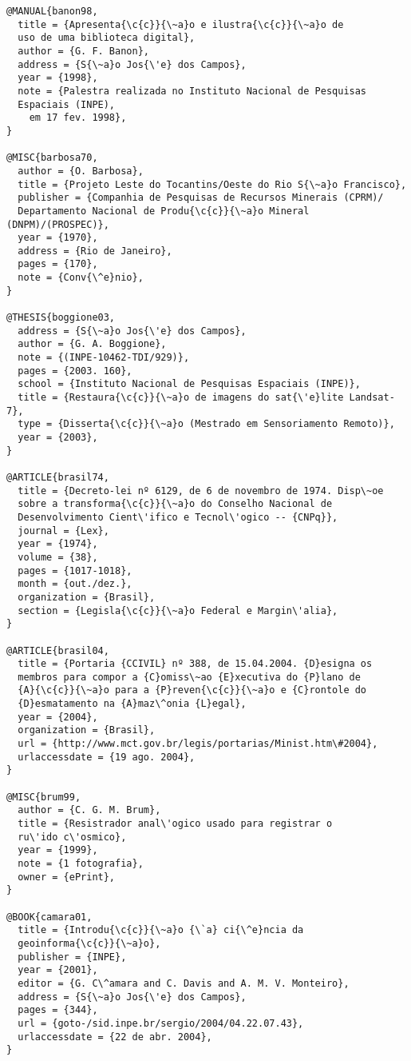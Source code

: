 \begin{verbatim}
@MANUAL{banon98,
  title = {Apresenta{\c{c}}{\~a}o e ilustra{\c{c}}{\~a}o de 
  uso de uma biblioteca digital},
  author = {G. F. Banon},
  address = {S{\~a}o Jos{\'e} dos Campos},
  year = {1998},
  note = {Palestra realizada no Instituto Nacional de Pesquisas 
  Espaciais (INPE),
	em 17 fev. 1998},
}

@MISC{barbosa70, 
  author = {O. Barbosa},
  title = {Projeto Leste do Tocantins/Oeste do Rio S{\~a}o Francisco},  
  publisher = {Companhia de Pesquisas de Recursos Minerais (CPRM)/
  Departamento Nacional de Produ{\c{c}}{\~a}o Mineral (DNPM)/(PROSPEC)},
  year = {1970},
  address = {Rio de Janeiro}, 
  pages = {170},
  note = {Conv{\^e}nio},
}

@THESIS{boggione03,
  address = {S{\~a}o Jos{\'e} dos Campos},
  author = {G. A. Boggione}, 
  note = {(INPE-10462-TDI/929)},
  pages = {2003. 160},
  school = {Instituto Nacional de Pesquisas Espaciais (INPE)},
  title = {Restaura{\c{c}}{\~a}o de imagens do sat{\'e}lite Landsat-7},
  type = {Disserta{\c{c}}{\~a}o (Mestrado em Sensoriamento Remoto)},
  year = {2003},
}

@ARTICLE{brasil74,
  title = {Decreto-lei nº 6129, de 6 de novembro de 1974. Disp\~oe 
  sobre a transforma{\c{c}}{\~a}o do Conselho Nacional de 
  Desenvolvimento Cient\'ifico e Tecnol\'ogico -- {CNPq}},
  journal = {Lex},
  year = {1974},
  volume = {38},
  pages = {1017-1018},
  month = {out./dez.},
  organization = {Brasil},
  section = {Legisla{\c{c}}{\~a}o Federal e Margin\'alia},
}

@ARTICLE{brasil04,
  title = {Portaria {CCIVIL} nº 388, de 15.04.2004. {D}esigna os 
  membros para compor a {C}omiss\~ao {E}xecutiva do {P}lano de 
  {A}{\c{c}}{\~a}o para a {P}reven{\c{c}}{\~a}o e {C}rontole do 
  {D}esmatamento na {A}maz\^onia {L}egal},
  year = {2004},
  organization = {Brasil},
  url = {http://www.mct.gov.br/legis/portarias/Minist.htm\#2004},
  urlaccessdate = {19 ago. 2004},
}

@MISC{brum99,
  author = {C. G. M. Brum},
  title = {Resistrador anal\'ogico usado para registrar o 
  ru\'ido c\'osmico},
  year = {1999},
  note = {1 fotografia},
  owner = {ePrint},
}

@BOOK{camara01,
  title = {Introdu{\c{c}}{\~a}o {\`a} ci{\^e}ncia da 
  geoinforma{\c{c}}{\~a}o},
  publisher = {INPE},
  year = {2001},
  editor = {G. C\^amara and C. Davis and A. M. V. Monteiro},
  address = {S{\~a}o Jos{\'e} dos Campos},
  pages = {344},
  url = {goto-/sid.inpe.br/sergio/2004/04.22.07.43},
  urlaccessdate = {22 de abr. 2004},
}


\end{verbatim}
